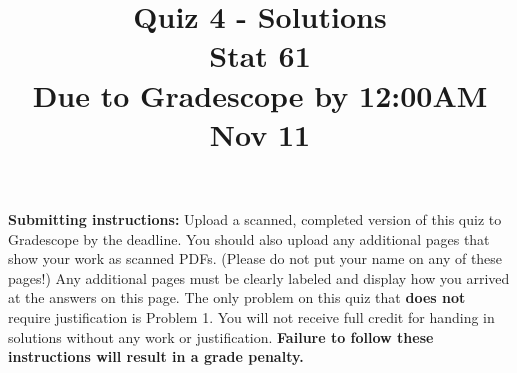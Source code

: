 \documentclass[12pt]{article}
\title{Quiz 4 - Solutions\\
Stat 61\\ 
Due to Gradescope by 12:00AM Nov 11 }
\date{}
\begin{document}
\maketitle


\vspace{-3cm}

\textbf{Submitting instructions:} Upload a scanned, completed version of this quiz to Gradescope by the deadline. You should also upload any additional pages that show your work as scanned PDFs. (Please do not put your name on any of these pages!) Any additional pages must be clearly labeled and display how you arrived at the answers on this page. The only problem on this quiz that \textbf{does not} require justification is Problem 1. You will not receive full credit for handing in solutions without any work or justification. \textbf{Failure to follow these instructions will result in a grade penalty.}
\end{document}
